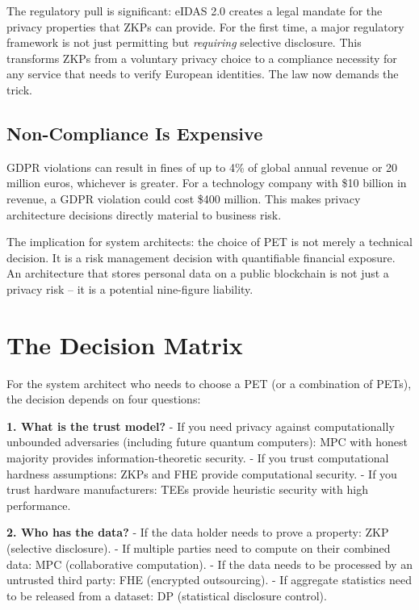 \documentclass[
  11pt,
  openany]{report}
\renewcommand{\textbf}[1]{{\bfseries\color{MidnightBold}#1}}
\begin{document}
The regulatory pull is significant: eIDAS 2.0 creates a legal mandate for the
privacy properties that ZKPs can provide. For the first time, a major regulatory
framework is not just permitting but \emph{requiring} selective disclosure. This
transforms ZKPs from a voluntary privacy choice to a compliance necessity for
any service that needs to verify European identities. The law now demands the
trick.

\subsection{Non-Compliance Is Expensive}\label{non-compliance-is-expensive}

GDPR violations can result in fines of up to 4\% of global annual revenue or 20
million euros, whichever is greater. For a technology company with \$10 billion
in revenue, a GDPR violation could cost \$400 million. This makes privacy
architecture decisions directly material to business risk.

The implication for system architects: the choice of PET is not merely a
technical decision. It is a risk management decision with quantifiable financial
exposure. An architecture that stores personal data on a public blockchain is
not just a privacy risk -- it is a potential nine-figure liability.

\section{The Decision Matrix}\label{the-decision-matrix}

For the system architect who needs to choose a PET (or a combination of PETs),
the decision depends on four questions:

\textbf{1. What is the trust model?} - If you need privacy against
computationally unbounded adversaries (including future quantum computers): MPC
with honest majority provides information-theoretic security. - If you trust
computational hardness assumptions: ZKPs and FHE provide computational security.
- If you trust hardware manufacturers: TEEs provide heuristic security with high
performance.

\textbf{2. Who has the data?} - If the data holder needs to prove a property:
ZKP (selective disclosure). - If multiple parties need to compute on their
combined data: MPC (collaborative computation). - If the data needs to be
processed by an untrusted third party: FHE (encrypted outsourcing). - If
aggregate statistics need to be released from a dataset: DP (statistical
disclosure control).
\end{document}
